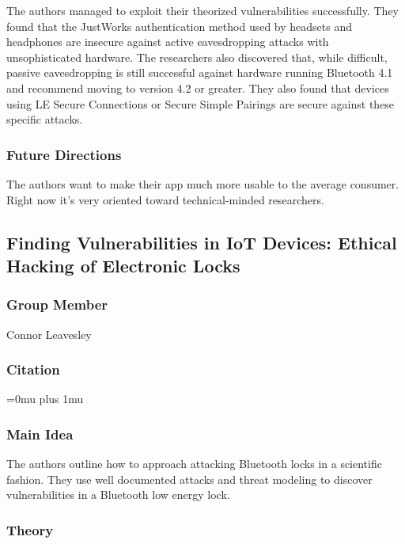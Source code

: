 \documentclass[letterpaper,12pt]{article}
\begin{document}
\noindent
The authors managed to exploit their theorized vulnerabilities successfully.  They found that the JustWorks authentication method used by headsets and headphones are insecure against active eavesdropping attacks with unsophisticated hardware.  The researchers also discovered that, while difficult, passive eavesdropping is still successful against hardware running Bluetooth 4.1 and recommend moving to version 4.2 or greater.  They also found that devices using LE Secure Connections or Secure Simple Pairings are secure against these specific attacks.

\subsubsection{Future Directions}

\noindent
The authors want to make their app much more usable to the average consumer.  Right now it's very oriented toward technical-minded researchers.

\subsection[Finding Vulnerabilities in IoT Devices: Ethical Hacking of Electronic Locks]{Finding Vulnerabilities in IoT Devices: Ethical \\Hacking of Electronic Locks}

\subsubsection{Group Member}

\noindent
Connor Leavesley

\noindent
\subsubsection{Citation}

\Urlmuskip=0mu plus 1mu\relax
{}

\subsubsection{Main Idea}

\noindent
The authors outline how to approach attacking Bluetooth locks in a scientific fashion. They use well documented attacks and threat modeling to discover vulnerabilities in a Bluetooth low energy lock.

\subsubsection{Theory}
\end{document}
